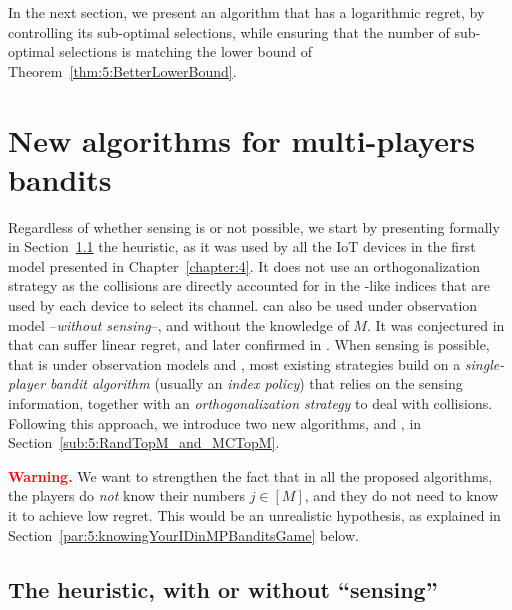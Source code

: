 In the next section, we present an algorithm that has a logarithmic regret,
by controlling its sub-optimal selections,
while ensuring that the number of sub-optimal selections is matching the lower bound of Theorem~\ref{thm:5:BetterLowerBound}.



\section{New algorithms for multi-players bandits}
\label{sec:5:algorithms}


Regardless of whether sensing is or not possible, we start by presenting formally in Section~\ref{sub:5:Selfish} the \Selfish{} heuristic, as it was used by all the IoT devices in the first model presented in Chapter~\ref{chapter:4}.
It does not use an orthogonalization strategy as the collisions are directly accounted for in the \UCB-like indices that are used by each device to select its channel.
\Selfish{} can also be used under observation model \modeltrois{} --\emph{without sensing}--, and without the knowledge of $M$.
It was conjectured in \cite{Besson2018ALT} that \Selfish{} can suffer linear regret, and later confirmed in \cite{LugosiMehrabian18,BoursierPerchet18}.
%
When sensing is possible, that is under observation models \modelun{} and \modeldeux, most existing strategies build on a \emph{single-player bandit algorithm} (usually an \emph{index policy}) that relies on the sensing information, together with an \emph{orthogonalization strategy} to deal with collisions.
Following this approach, we introduce two new algorithms, \RandTopM{} and \MCTopM, in Section~\ref{sub:5:RandTopM_and_MCTopM}.


\begin{leftbar}[warningbar]  %
  \textcolor{red}{\textbf{Warning.}}
  We want to strengthen the fact that in all the proposed algorithms,
  the players do \emph{not} know their numbers $j\in[M]$,
  and they do not need to know it to achieve low regret.
  This would be an unrealistic hypothesis, as explained in Section~\ref{par:5:knowingYourIDinMPBanditsGame} below.
\end{leftbar}  %


\subsection{The \Selfish{} heuristic, with or without ``sensing''}
\label{sub:5:Selfish}

